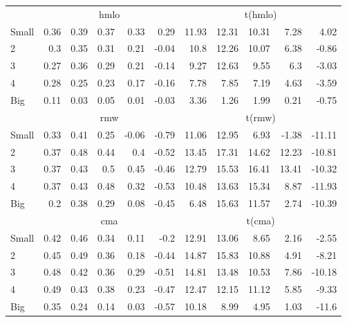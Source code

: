 \begin{table}[!ht]
\begin{tabular}{lrrrrrrrrrr}
  

      & \multicolumn{5}{c}{hmlo} & \multicolumn{5}{c}{t(hmlo)} \\
    \cmidrule(r){2-6} \cmidrule(r){7-11}
      Small  & 0.36  & 0.39  & 0.37  & 0.33  & 0.29   & 11.93  & 12.31  & 10.31  & 7.28  & 4.02  \\
          2  & 0.3  & 0.35  & 0.31  & 0.21  & -0.04   & 10.8  & 12.26  & 10.07  & 6.38  & -0.86  \\
          3  & 0.27  & 0.36  & 0.29  & 0.21  & -0.14   & 9.27  & 12.63  & 9.55  & 6.3  & -3.03  \\
          4  & 0.28  & 0.25  & 0.23  & 0.17  & -0.16   & 7.78  & 7.85  & 7.19  & 4.63  & -3.59  \\
      Big    & 0.11  & 0.03  & 0.05  & 0.01  & -0.03   & 3.36  & 1.26  & 1.99  & 0.21  & -0.75  \\

  

      & \multicolumn{5}{c}{rmw} & \multicolumn{5}{c}{t(rmw)} \\
    \cmidrule(r){2-6} \cmidrule(r){7-11}
      Small  & 0.33  & 0.41  & 0.25  & -0.06  & -0.79   & 11.06  & 12.95  & 6.93  & -1.38  & -11.11  \\
          2  & 0.37  & 0.48  & 0.44  & 0.4  & -0.52   & 13.45  & 17.31  & 14.62  & 12.23  & -10.81  \\
          3  & 0.37  & 0.43  & 0.5  & 0.45  & -0.46   & 12.79  & 15.53  & 16.41  & 13.41  & -10.32  \\
          4  & 0.37  & 0.43  & 0.48  & 0.32  & -0.53   & 10.48  & 13.63  & 15.34  & 8.87  & -11.93  \\
      Big    & 0.2  & 0.38  & 0.29  & 0.08  & -0.45   & 6.48  & 15.63  & 11.57  & 2.74  & -10.39  \\

  

      & \multicolumn{5}{c}{cma} & \multicolumn{5}{c}{t(cma)} \\
    \cmidrule(r){2-6} \cmidrule(r){7-11}
      Small  & 0.42  & 0.46  & 0.34  & 0.11  & -0.2   & 12.91  & 13.06  & 8.65  & 2.16  & -2.55  \\
          2  & 0.45  & 0.49  & 0.36  & 0.18  & -0.44   & 14.87  & 15.83  & 10.88  & 4.91  & -8.21  \\
          3  & 0.48  & 0.42  & 0.36  & 0.29  & -0.51   & 14.81  & 13.48  & 10.53  & 7.86  & -10.18  \\
          4  & 0.49  & 0.43  & 0.38  & 0.23  & -0.47   & 12.47  & 12.15  & 11.12  & 5.85  & -9.33  \\
      Big    & 0.35  & 0.24  & 0.14  & 0.03  & -0.57   & 10.18  & 8.99  & 4.95  & 1.03  & -11.6  \\

  

  \bottomrule
\end{tabular}
\label{tbl:25_Size_Vol_FF2015}
\end{table}